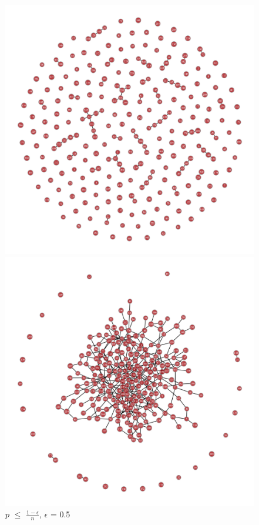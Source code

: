 \documentclass{article}
\begin{document}
\begin{figure}[!htb]
  \includegraphics[width=\linewidth]{ER_SP.png}
  \caption*{$p$ $\leq$ $\frac{1-\epsilon}{n}$, $\epsilon$ = 0.5}
\endminipage\hfill
{}
  \includegraphics[width=\linewidth]{ER_GC.png}

\end{figure}
\end{document}
